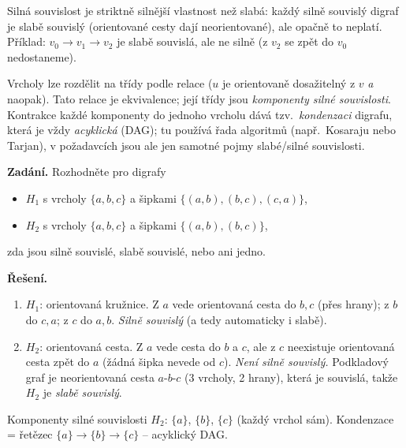 \documentclass[11pt,a4paper]{article}
\begin{document}
\begin{intuice}
Silná souvislost je striktně silnější vlastnost než slabá: každý silně souvislý digraf je slabě souvislý (orientované cesty dají neorientované), ale opačně to neplatí. Příklad:  $v_0\to v_1\to v_2$ je slabě souvislá, ale ne silně (z $v_2$ se zpět do $v_0$ nedostaneme).
\end{intuice}

\begin{poznamka}
Vrcholy lze rozdělit na třídy podle relace  ($u$ je orientovaně dosažitelný z $v$ \emph{a} naopak). Tato relace je ekvivalence; její třídy jsou \emph{komponenty silné souvislosti}. Kontrakce každé komponenty do jednoho vrcholu dává tzv.\ \emph{kondenzaci} digrafu, která je vždy \emph{acyklická} (DAG); tu používá řada algoritmů (např.\ Kosaraju nebo Tarjan), v požadavcích jsou ale jen samotné pojmy slabé/silné souvislosti.
\end{poznamka}

\begin{priklad}
\textbf{Zadání.}
Rozhodněte pro digrafy
\begin{itemize}
  \item $H_1$ s vrcholy $\{a,b,c\}$ a šipkami $\{(a,b),(b,c),(c,a)\}$,
  \item $H_2$ s vrcholy $\{a,b,c\}$ a šipkami $\{(a,b),(b,c)\}$,
\end{itemize}
zda jsou silně souvislé, slabě souvislé, nebo ani jedno.

\textbf{Řešení.}
\begin{enumerate}[label=(\arabic*)]
  \item $H_1$: orientovaná kružnice. Z $a$ vede orientovaná cesta do $b,c$ (přes hrany); z $b$ do $c,a$; z $c$ do $a,b$. \emph{Silně souvislý} (a tedy automaticky i slabě).
  \item $H_2$: orientovaná cesta. Z $a$ vede cesta do $b$ a $c$, ale z $c$ neexistuje orientovaná cesta zpět do $a$ (žádná šipka nevede od $c$). \emph{Není silně souvislý.} Podkladový graf je neorientovaná cesta $a$-$b$-$c$ (3 vrcholy, 2 hrany), která je souvislá, takže $H_2$ je \emph{slabě souvislý}.
\end{enumerate}
Komponenty silné souvislosti $H_2$: $\{a\}$, $\{b\}$, $\{c\}$ (každý vrchol sám). Kondenzace = řetězec $\{a\}\to\{b\}\to\{c\}$ -- acyklický DAG.
\end{priklad}
\end{document}
